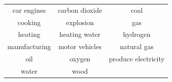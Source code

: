 \documentclass[12pt]{exam}
\begin{document}
\begin{tabular}{ |c c c|}
    \hline
    car engines     & carbon dioxide    & coal\\ 
    cooking         & explosion         & gas\\ 
    heating         & heating water     & hydrogen\\ 
    manufacturing   & motor vehicles    & natural gas\\ 
    oil             & oxygen            & produce electricity\\ 
    water           & wood              & \\ 
    \hline    
\end{tabular}




















    
    
\end{document}
